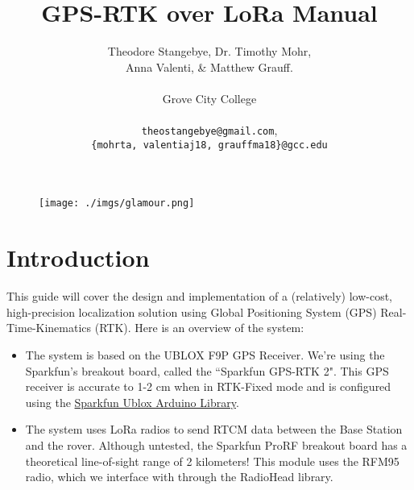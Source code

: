 \documentclass{article}%
\begin{document}
\title{GPS-RTK over LoRa Manual}
\author{Theodore Stangebye, Dr. Timothy Mohr,\\
Anna Valenti, \& Matthew Grauff. \\ \\
Grove City College\\ \\
\texttt{theostangebye@gmail.com}, \\
\texttt{\{mohrta, valentiaj18, grauffma18\}@gcc.edu}}
\maketitle





\vspace*{\fill}
\tableofcontents
\vspace*{\fill}

\newpage

\begin{figure}
\centering
\begin{minipage}{.5\textwidth}
  \centering
  \texttt{[image: ./imgs/glamour.png]}
  \label{fig:glamour}
\end{minipage}%
\end{figure}

\section{Introduction}

This guide will cover the design and implementation of a (relatively) low-cost, high-precision localization solution using Global Positioning System (GPS) Real-Time-Kinematics (RTK).  Here is an overview of the system:

\begin{itemize}
	\item The system is based on the UBLOX F9P GPS Receiver.  We're using the Sparkfun's breakout board, called the ``Sparkfun GPS-RTK 2".  This GPS receiver is accurate to 1-2 cm when in RTK-Fixed mode and is configured using the \href{https://github.com/sparkfun/SparkFun_Ublox_Arduino_Library}{Sparkfun Ublox Arduino Library}.
	\item The system uses LoRa radios to send RTCM data between the Base Station and the rover.  Although untested, the Sparkfun ProRF breakout board has a theoretical line-of-sight range of 2 kilometers!  This module uses the RFM95 radio, which we interface with through the RadioHead library.
\end{itemize}
\end{document}
